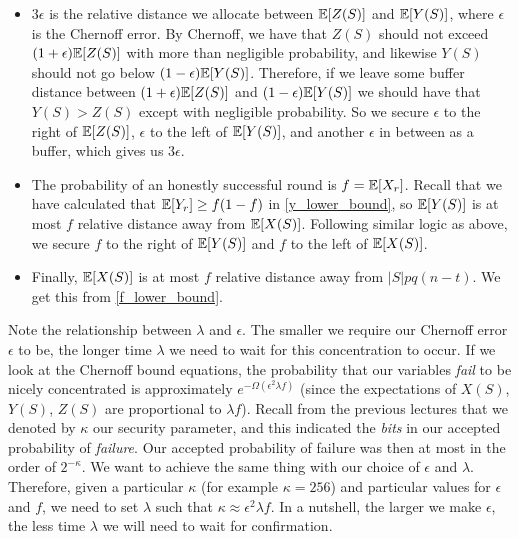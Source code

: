 \begin{itemize}
    \item $3 \epsilon$ is the relative distance we allocate between $\mathbb{E}[Z(S)]$ and $\mathbb{E}[Y(S)]$, where $\epsilon$ is the Chernoff error. By Chernoff, we have that $Z(S)$ should not exceed $(1+\epsilon)\mathbb{E}[Z(S)]$ with more than negligible probability, and likewise $Y(S)$ should not go below $(1-\epsilon)\mathbb{E}[Y(S)]$. Therefore, if we leave some buffer distance between $(1+\epsilon)\mathbb{E}[Z(S)]$ and $(1-\epsilon)\mathbb{E}[Y(S)]$ we should have that $Y(S) > Z(S)$ except with negligible probability. So we secure $\epsilon$ to the right of $\mathbb{E}[Z(S)]$, $\epsilon$ to the left of $\mathbb{E}[Y(S)]$, and another $\epsilon$ in between as a buffer, which gives us $3 \epsilon$.

    \item The probability of an honestly successful round is $f=\mathbb{E}[X_r]$. Recall that we have calculated that $\mathbb{E}[Y_r] \geq f (1-f)$ in \eqref{y_lower_bound}, so $\mathbb{E}[Y(S)]$ is at most $f$ relative distance away from $\mathbb{E}[X(S)]$. Following similar logic as above, we secure $f$ to the right of $\mathbb{E}[Y(S)]$ and $f$ to the left of $\mathbb{E}[X(S)]$.

    \item Finally, $\mathbb{E}[X(S)]$ is at most $f$ relative distance away from $|S|pq(n-t)$. We get this from \eqref{f_lower_bound}.

\end{itemize}

Note the relationship between $\lambda$ and $\epsilon$. The smaller we require our Chernoff error $\epsilon$ to be, the longer time $\lambda$ we need to wait for this concentration to occur. If we look at the Chernoff bound equations, the probability that our variables \emph{fail} to be nicely concentrated is approximately $e^{-\Omega(\epsilon^2 \lambda f)}$ (since the expectations of $X(S)$, $Y(S)$, $Z(S)$ are proportional to $\lambda f$). Recall from the previous lectures that we denoted by $\kappa$ our security parameter, and this indicated the \emph{bits} in our accepted probability of \emph{failure}. Our accepted probability of failure was then at most in the order of $2^{-\kappa}$. We want to achieve the same thing with our choice of $\epsilon$ and $\lambda$. Therefore, given a particular $\kappa$ (for example $\kappa = 256$) and particular values for $\epsilon$ and $f$, we need to set $\lambda$ such that $\kappa \approx \epsilon^2 \lambda f$. In a nutshell, the larger we make $\epsilon$, the less time $\lambda$ we will need to wait for confirmation.

